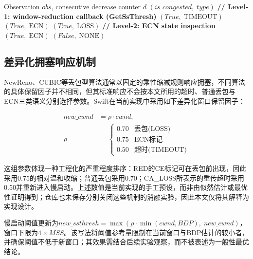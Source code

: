 \documentclass[10pt,twocolumn]{article}
\begin{document}
\begin{algorithm}[htbp]
\caption{Multi-Signal Fusion Congestion Detection}
\label{alg:detect}
\small
\begin{algorithmic}[1]
\REQUIRE Observation $obs$, consecutive decrease counter $d$
\ENSURE $(is\_congested, \; type)$
\STATE \textbf{// Level-1: window-reduction callback (GetSsThresh)}
        \RETURN $(True, \; \text{TIMEOUT})$
        \RETURN $(True, \; \text{ECN})$
    \ELSE
        \RETURN $(True, \; \text{LOSS})$
    \ENDIF
\ENDIF
\STATE \textbf{// Level-2: ECN state inspection}
    \RETURN $(True, \; \text{ECN})$
\ENDIF
\RETURN $(False, \; \text{NONE})$
\end{algorithmic}
\end{algorithm}

\subsection{差异化拥塞响应机制}

NewReno、CUBIC等丢包型算法通常以固定的乘性缩减规则响应拥塞，不同算法的具体保留因子并不相同，但其标准响应不会按本文所用的超时、普通丢包与ECN三类语义分别选择参数。Swift在当前实现中采用如下差异化窗口保留因子：

\begin{equation}
\begin{aligned}
new\_cwnd &= \rho \cdot cwnd, \\
\rho &= \begin{cases}
0.70 & \text{丢包(LOSS)} \\
0.75 & \text{ECN标记} \\
0.50 & \text{超时(TIMEOUT)}
\end{cases}
\end{aligned}
\end{equation}

这组参数体现一种工程化的严重程度排序：RED的CE标记可在丢包前出现，因此采用0.75的相对温和收缩；普通丢包采用0.70；CA\_LOSS所表示的重传超时采用0.50并重新进入慢启动。上述数值是当前实现的手工预设，而非由似然估计或最优性证明得到；仓库也未保存分别关闭这些机制的消融实验，因此本文仅将其解释为实现设计。

慢启动阈值更新为$new\_ssthresh = \max(\rho \cdot \min(cwnd, BDP), \; new\_cwnd)$，窗口下限为$4 \times MSS$。该写法将阈值参考量限制在当前窗口与BDP估计的较小者，并确保阈值不低于新窗口；其效果需结合后续实验观察，而不被表述为一般性最优结论。
\end{document}
